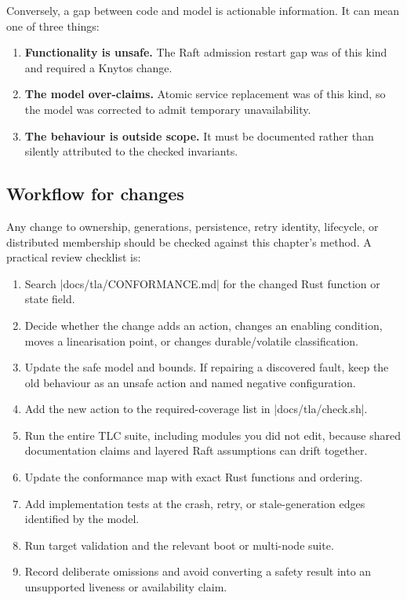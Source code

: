 Conversely, a gap between code and model is actionable information. It can
mean one of three things:

\begin{enumerate}
    \item \textbf{Functionality is unsafe.} The Raft admission restart gap was
        of this kind and required a Knytos change.
    \item \textbf{The model over-claims.} Atomic service replacement was of this
        kind, so the model was corrected to admit temporary unavailability.
    \item \textbf{The behaviour is outside scope.} It must be documented rather
        than silently attributed to the checked invariants.
\end{enumerate}

\begin{samepage}
\section{Workflow for changes}

Any change to ownership, generations, persistence, retry identity, lifecycle,
or distributed membership should be checked against this chapter's method.
A practical review checklist is:

\begin{enumerate}
    \item Search \repofile|docs/tla/CONFORMANCE.md| for the changed Rust
        function or state field.
    \item Decide whether the change adds an action, changes an enabling
        condition, moves a linearisation point, or changes durable/volatile
        classification.
    \item Update the safe model and bounds. If repairing a discovered fault,
        keep the old behaviour as an unsafe action and named negative
        configuration.
    \item Add the new action to the required-coverage list in
        \repofile|docs/tla/check.sh|.
    \item Run the entire TLC suite, including modules you did not edit, because shared
        documentation claims and layered Raft assumptions can drift together.
    \item Update the conformance map with exact Rust functions and ordering.
    \item Add implementation tests at the crash, retry, or stale-generation
        edges identified by the model.
    \item Run target validation and the relevant boot or multi-node suite.
    \item Record deliberate omissions and avoid converting a safety result into
        an unsupported liveness or availability claim.
\end{enumerate}
\end{samepage}

\endinput
